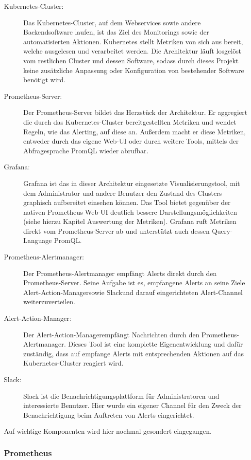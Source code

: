 \documentclass[a4paper,10pt]{scrartcl}
\begin{document}
\begin{description}
\item[Kubernetes-Cluster:]
Das Kubernetes-Cluster, auf dem Webservices sowie andere Backendsoftware laufen, ist das Ziel des Monitorings sowie der automatisierten Aktionen. Kubernetes stellt Metriken von sich aus bereit, welche ausgelesen und verarbeitet werden. Die Architektur läuft losgelöst vom restlichen Cluster und dessen Software, sodass durch dieses Projekt keine zusätzliche Anpassung oder Konfiguration von bestehender Software benötigt wird.
\item[Prometheus-Server:]
Der Prometheus-Server bildet das Herzstück der Architektur. Er aggregiert die durch das Kubernetes-Cluster bereitgestellten Metriken und wendet Regeln, wie das Alerting, auf diese an. Außerdem macht er diese Metriken, entweder durch das eigene Web-UI oder durch weitere Tools, mittels der Abfragesprache PromQL wieder abrufbar.
\item[Grafana:]
Grafana ist das in dieser Architektur eingesetzte Visualisierungstool, mit dem Administrator und andere Benutzer den Zustand des Clusters graphisch aufbereitet einsehen können. Das Tool bietet gegenüber der nativen Prometheus Web-UI deutlich bessere Darstellungsmöglichkeiten (siehe hierzu Kapitel Auswertung der Metriken). Grafana ruft Metriken direkt vom Prometheus-Server ab und unterstützt auch dessen Query-Language PromQL.
\item[Prometheus-Alertmanager:]
Der Prometheus-Alertmanager empfängt Alerts direkt durch den Prometheus-Server. Seine Aufgabe ist es, empfangene Alerts an seine Ziele \glqq Alert-Action-Manager\grqq sowie \glqq Slack\grqq und darauf eingerichteten Alert-Channel weiterzuverteilen.
\item[Alert-Action-Manager:]
Der \glqq Alert-Action-Manager\grqq empfängt Nachrichten durch den Prometheus-Alertmanager. Dieses Tool ist eine komplette Eigenentwicklung und dafür zuständig, dass auf empfange Alerts mit entsprechenden Aktionen auf das Kubernetes-Cluster reagiert wird.
\item[Slack:]
Slack ist die Benachrichtigungsplattform für Administratoren und interessierte Benutzer. Hier wurde ein eigener Channel für den Zweck der Benachrichtigung beim Auftreten von Alerts eingerichtet.

\end{description}

Auf wichtige Komponenten wird hier nochmal gesondert eingegangen.

\subsubsection{Prometheus}
\end{document}
